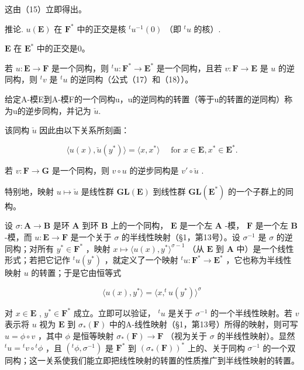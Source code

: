 这由（15）立即得出。

推论. \(u(\mathbf{E})\) 在 \(\mathbf{F}^*\) 中的正交是核 \({}^t u^{-1}(0)\) （即 \({}^t u\) 的核）.

\(\mathbf{E}\) 在 \(\mathbf{E}^*\) 中的正交是0。

若 \(u: \mathbf{E} \to \mathbf{F}\) 是一个同构，则 \({}^{t}u: \mathbf{F}^{*} \to \mathbf{E}^{*}\) 是一个同构，且若 \(v: \mathbf{F} \to \mathbf{E}\) 是 \(u\) 的逆同构，则 \({}^{t}v\) 是 \({}^{t}u\) 的逆同构（公式（17）和（18））。

给定A-模E到A-模F的一个同构u，u的逆同构的转置（等于u的转置的逆同构）称为u的逆步同构，并记为 \(\check{u}\).

该同构 \(\check{u}\) 因此由以下关系所刻画：

\[
\langle u (x), \check {u} (y ^ {*}) \rangle = \langle x, x ^ {*} \rangle \quad \text { for } x \in \mathbf {E}, x ^ {*} \in \mathbf {E} ^ {*}.\tag{19}
\]

若 \(v: \mathbf{F} \to \mathbf{G}\) 是一个同构，则 \(v \circ u\) 的逆步同构是 \(v' \circ \check{u}\) .

特别地，映射 \(u \mapsto \check{u}\) 是线性群 \(\mathbf{GL}(\mathbf{E})\) 到线性群 \(\mathbf{GL}(\mathbf{E}^*)\) 的一个子群上的同构。

设 \(\sigma: \mathbf{A} \to \mathbf{B}\) 是环 \(\mathbf{A}\) 到环 \(\mathbf{B}\) 上的一个同构， \(\mathbf{E}\) 是一个左 \(\mathbf{A}\) -模， \(\mathbf{F}\) 是一个左 \(\mathbf{B}\) -模，而 \(u: \mathbf{E} \to \mathbf{F}\) 是一个关于 \(\sigma\) 的半线性映射（§1，第13号）。设 \(\sigma^{-1}\) 是 \(\sigma\) 的逆同构；对所有 \(y^{*} \in \mathbf{F}^{*}\) ，映射 \(x \mapsto \langle u(x), y^{*} \rangle^{\sigma - 1}\) （从 \(\mathbf{E}\) 到 \(\mathbf{A}\) 中）是一个线性形式；若把它记作 \(^t u(y^*)\) ，就定义了一个映射 \(^t u: \mathbf{F}^{*} \to \mathbf{E}^{*}\) ，它也称为半线性映射 \(u\) 的转置；于是它由恒等式

\[
\langle u (x), y ^ {*} \rangle = \langle x, ^ {t} u (y ^ {*}) \rangle^ {\sigma}\tag{20}
\]

对 \(x \in \mathbf{E}\) , \(y^* \in \mathbf{F}^*\) 成立。立即可以验证， \({}^t u\) 是关于 \(\sigma^{-1}\) 的一个半线性映射。若 \(v\) 表示将 \(u\) 视为 \(\mathbf{E}\) 到 \(\sigma_*(\mathbf{F})\) 中的A-线性映射（§1，第13号）所得的映射，则可写 \(u = \phi \circ v\) ，其中 \(\phi\) 是恒等映射 \(\sigma_*(\mathbf{F}) \to \mathbf{F}\) （视为关于 \(\sigma\) 的半线性映射）。显然 \({}^t u = {}^t v \circ {}^t \phi\) ，且 \(({}^t \phi, \sigma^{-1})\) 是 \(\mathbf{F}^*\) 到 \((\sigma_*(\mathbf{F}))^*\) 上的、关于同构 \(\sigma^{-1}\) 的一个双同构；这一关系使我们能立即把线性映射的转置的性质推广到半线性映射的转置。

